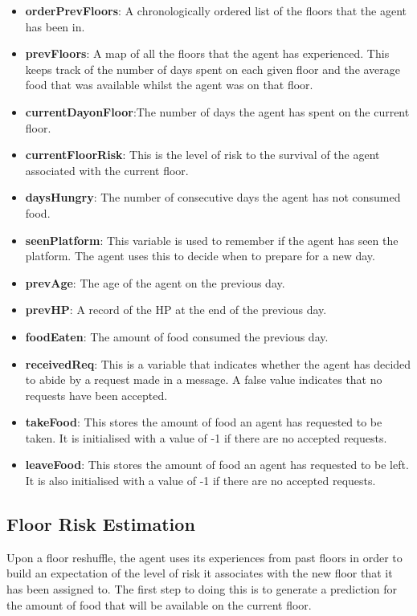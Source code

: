 \begin{itemize}
    \item  \textbf{orderPrevFloors}: A chronologically ordered list of the floors that the agent has been in. 
    \item  \textbf{prevFloors}: A map of all the floors that the agent has experienced. This keeps track of the number of days spent on each given floor and the average food that was available whilst the agent was on that floor.
    \item  \textbf{currentDayonFloor}:The number of days the agent has spent on the current floor.
    \item  \textbf{currentFloorRisk}: This is the level of risk to the survival of the agent associated with the current floor. 

    \item  \textbf{daysHungry}: The number of consecutive days the agent has not consumed food.
    \item  \textbf{seenPlatform}: This variable is used to remember if the agent has seen the platform. The agent uses this to decide when to prepare for a new day.
    \item  \textbf{prevAge}: The age of the agent on the previous day.
    \item  \textbf{prevHP}: A record of the HP at the end of the previous day.
    \item  \textbf{foodEaten}: The amount of food consumed the previous day.
    \item  \textbf{receivedReq}: This is a variable that indicates whether the agent has decided to abide by a request made in a message. A false value indicates that no requests have been accepted. 
    \item  \textbf{takeFood}: This stores the amount of food an agent has requested to be taken. It is initialised with a value of -1 if there are no accepted requests.
    \item  \textbf{leaveFood}: This stores the amount of food an agent has requested to be left. It is also initialised with a value of -1 if there are no accepted requests.
\end{itemize}

\subsection{Floor Risk Estimation}
\label{subsec: Floor Map}
Upon a floor reshuffle, the agent uses its experiences from past floors in order to build an expectation of the level of risk it associates with the new floor that it has been assigned to. The first step to doing this is to generate a prediction for the amount of food that will be available on the current floor. 

